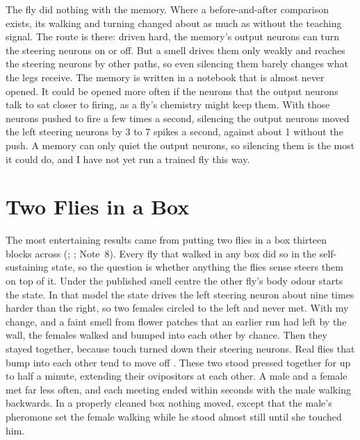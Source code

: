 The fly did nothing with the memory. Where a before-and-after comparison exists, its walking and turning changed about as much as without the teaching signal. The route is there: driven hard, the memory's output neurons can turn the steering neurons on or off. But a smell drives them only weakly and reaches the steering neurons by other paths, so even silencing them barely changes what the legs receive. The memory is written in a notebook that is almost never opened. It could be opened more often if the neurons that the output neurons talk to sat closer to firing, as a fly's chemistry might keep them. With those neurons pushed to fire a few times a second, silencing the output neurons moved the left steering neurons by 3 to 7 spikes a second, against about 1 without the push. A memory can only quiet the output neurons, so silencing them is the most it could do, and I have not yet run a trained fly this way.

\section{Two Flies in a Box}
\label{sec:arena}

The most entertaining results came from putting two flies in a box thirteen blocks across (; ; Note~8). Every fly that walked in any box did so in the self-sustaining state, so the question is whether anything the flies sense steers them on top of it. Under the published smell centre the other fly's body odour starts the state. In that model the state drives the left steering neuron about nine times harder than the right, so two females circled to the left and never met. With my change, and a faint smell from flower patches that an earlier run had left by the wall, the females walked and bumped into each other by chance. Then they stayed together, because touch turned down their steering neurons. Real flies that bump into each other tend to move off \citep{ramdya2015mechanosensory}. These two stood pressed together for up to half a minute, extending their ovipositors at each other. A male and a female met far less often, and each meeting ended within seconds with the male walking backwards. In a properly cleaned box nothing moved, except that the male's pheromone set the female walking while he stood almost still until she touched him.

